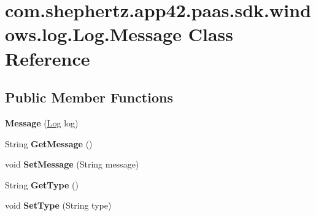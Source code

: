 \hypertarget{classcom_1_1shephertz_1_1app42_1_1paas_1_1sdk_1_1windows_1_1log_1_1_log_1_1_message}{\section{com.\+shephertz.\+app42.\+paas.\+sdk.\+windows.\+log.\+Log.\+Message Class Reference}
\label{classcom_1_1shephertz_1_1app42_1_1paas_1_1sdk_1_1windows_1_1log_1_1_log_1_1_message}
}
\subsection*{Public Member Functions}
\begin{DoxyCompactItemize}
\item 
\hypertarget{classcom_1_1shephertz_1_1app42_1_1paas_1_1sdk_1_1windows_1_1log_1_1_log_1_1_message_a23e0dc26a561c14b7e0a363e8248af96}{{\bfseries Message} (\hyperlink{classcom_1_1shephertz_1_1app42_1_1paas_1_1sdk_1_1windows_1_1log_1_1_log}{Log} log)}\label{classcom_1_1shephertz_1_1app42_1_1paas_1_1sdk_1_1windows_1_1log_1_1_log_1_1_message_a23e0dc26a561c14b7e0a363e8248af96}

\item 
\hypertarget{classcom_1_1shephertz_1_1app42_1_1paas_1_1sdk_1_1windows_1_1log_1_1_log_1_1_message_a8d2ba05d6f38cfdf26d67c6da1c01f96}{String {\bfseries Get\+Message} ()}\label{classcom_1_1shephertz_1_1app42_1_1paas_1_1sdk_1_1windows_1_1log_1_1_log_1_1_message_a8d2ba05d6f38cfdf26d67c6da1c01f96}

\item 
\hypertarget{classcom_1_1shephertz_1_1app42_1_1paas_1_1sdk_1_1windows_1_1log_1_1_log_1_1_message_a869916b77df631d98ace8c376f60433c}{void {\bfseries Set\+Message} (String message)}\label{classcom_1_1shephertz_1_1app42_1_1paas_1_1sdk_1_1windows_1_1log_1_1_log_1_1_message_a869916b77df631d98ace8c376f60433c}

\item 
\hypertarget{classcom_1_1shephertz_1_1app42_1_1paas_1_1sdk_1_1windows_1_1log_1_1_log_1_1_message_ac2b0b544f97aed14228ba175998e097a}{String {\bfseries Get\+Type} ()}\label{classcom_1_1shephertz_1_1app42_1_1paas_1_1sdk_1_1windows_1_1log_1_1_log_1_1_message_ac2b0b544f97aed14228ba175998e097a}

\item 
\hypertarget{classcom_1_1shephertz_1_1app42_1_1paas_1_1sdk_1_1windows_1_1log_1_1_log_1_1_message_afe95c95d308d513c6f2278cc2794e457}{void {\bfseries Set\+Type} (String type)}\label{classcom_1_1shephertz_1_1app42_1_1paas_1_1sdk_1_1windows_1_1log_1_1_log_1_1_message_afe95c95d308d513c6f2278cc2794e457}


\end{DoxyCompactItemize}
